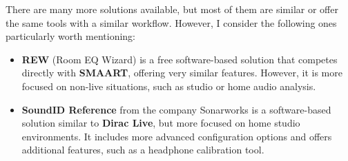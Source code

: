 There are many more solutions available, but most of them are similar or offer the same tools with a similar workflow. However, I consider the following ones particularly worth mentioning:

\begin{itemize}
	\item \textbf{REW} (Room EQ Wizard)\cite{rew} is a free software-based solution that competes directly with \textbf{SMAART}, offering very similar features. However, it is more focused on non-live situations, such as studio or home audio analysis.

	\item \textbf{SoundID Reference} from the company Sonarworks \cite{soundID} is a software-based solution similar to \textbf{Dirac Live}, but more focused on home studio environments. It includes more advanced configuration options and offers additional features, such as a headphone calibration tool.
	
\end{itemize}


